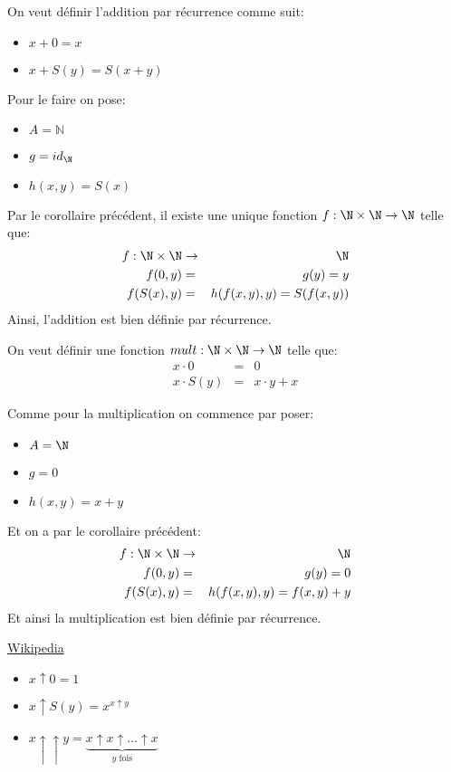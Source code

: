 \begin{example}
	On veut définir l'addition par récurrence comme suit:
	\begin{itemize}
		\item $x + 0 = x$
		\item $x + S(y) = S(x + y)$
	\end{itemize}
	Pour le faire on pose:
	\begin{itemize}
		\item $A = \mathbb{N}$
		\item $g = id_{\N}$
		\item $h(x,y) = S(x)$
	\end{itemize}
	Par le corollaire précédent, il existe une unique fonction $f: \N \times \N \to \N$ telle que:
	\begin{eqnarray*}
		f : \N \times \N & \to & \N \\
		f(0,y) & = & g(y) = y \\
		f(S(x),y) & = & h(f(x,y),y) = S(f(x,y))
	\end{eqnarray*}
	Ainsi, l'addition est bien définie par récurrence.
\end{example}

\begin{example}
	On veut définir une fonction $mult: \N \times \N \to \N$ telle que:
	\begin{eqnarray*}
		x \cdot 0 & = & 0 \\
		x \cdot S(y) & = & x \cdot y + x
	\end{eqnarray*}

	Comme pour la multiplication on commence par poser:
	\begin{itemize}
		\item $A = \N$
		\item $g = 0$
		\item $h(x,y) = x + y$
	\end{itemize}

	Et on a par le corollaire précédent:
	\begin{eqnarray*}
		f : \N \times \N & \to & \N \\
		f(0,y) & = & g(y) = 0 \\
		f(S(x),y) & = & h(f(x,y),y) = f(x,y) + y
	\end{eqnarray*}
	Et ainsi la multiplication est bien définie par récurrence.
\end{example}


\begin{example} \href{https://en.wikipedia.org/wiki/Knuth\%27s_up-arrow_notation}{Wikipedia}
	\begin{itemize}
		\item $x \uparrow 0 = 1$
		\item $x \uparrow S(y) = x^{x \uparrow y}$
		\item $x \uparrow \uparrow y = \underbrace{x \uparrow x \uparrow \ldots \uparrow x}_{y \text{ fois}}$
	\end{itemize}
\end{example}
